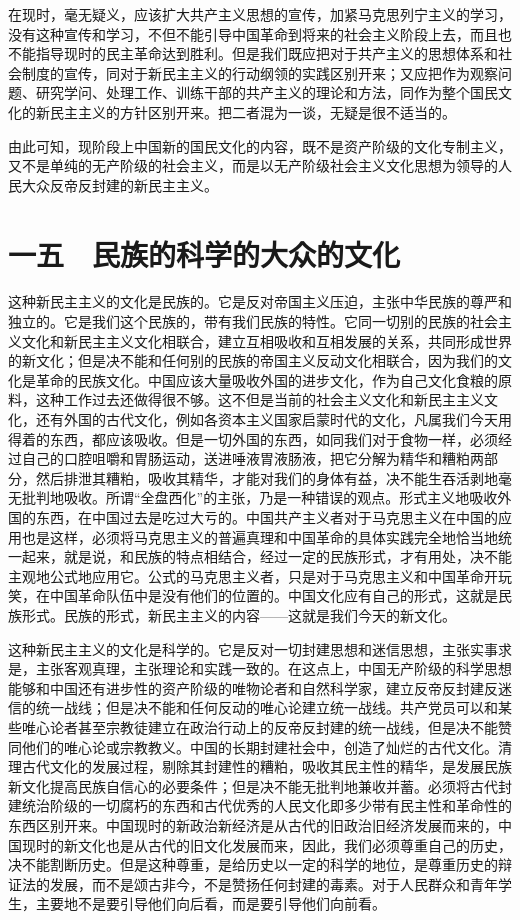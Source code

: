 在现时，毫无疑义，应该扩大共产主义思想的宣传，加紧马克思列宁主义的学习，没有这种宣传和学习，不但不能引导中国革命到将来的社会主义阶段上去，而且也不能指导现时的民主革命达到胜利。但是我们既应把对于共产主义的思想体系和社会制度的宣传，同对于新民主主义的行动纲领的实践区别开来；又应把作为观察问题、研究学问、处理工作、训练干部的共产主义的理论和方法，同作为整个国民文化的新民主主义的方针区别开来。把二者混为一谈，无疑是很不适当的。

由此可知，现阶段上中国新的国民文化的内容，既不是资产阶级的文化专制主义，又不是单纯的无产阶级的社会主义，而是以无产阶级社会主义文化思想为领导的人民大众反帝反封建的新民主主义。

\section{一五　民族的科学的大众的文化}

这种新民主主义的文化是民族的。它是反对帝国主义压迫，主张中华民族的尊严和独立的。它是我们这个民族的，带有我们民族的特性。它同一切别的民族的社会主义文化和新民主主义文化相联合，建立互相吸收和互相发展的关系，共同形成世界的新文化；但是决不能和任何别的民族的帝国主义反动文化相联合，因为我们的文化是革命的民族文化。中国应该大量吸收外国的进步文化，作为自己文化食粮的原料，这种工作过去还做得很不够。这不但是当前的社会主义文化和新民主主义文化，还有外国的古代文化，例如各资本主义国家启蒙时代的文化，凡属我们今天用得着的东西，都应该吸收。但是一切外国的东西，如同我们对于食物一样，必须经过自己的口腔咀嚼和胃肠运动，送进唾液胃液肠液，把它分解为精华和糟粕两部分，然后排泄其糟粕，吸收其精华，才能对我们的身体有益，决不能生吞活剥地毫无批判地吸收。所谓“全盘西化”的主张，乃是一种错误的观点。形式主义地吸收外国的东西，在中国过去是吃过大亏的。中国共产主义者对于马克思主义在中国的应用也是这样，必须将马克思主义的普遍真理和中国革命的具体实践完全地恰当地统一起来，就是说，和民族的特点相结合，经过一定的民族形式，才有用处，决不能主观地公式地应用它。公式的马克思主义者，只是对于马克思主义和中国革命开玩笑，在中国革命队伍中是没有他们的位置的。中国文化应有自己的形式，这就是民族形式。民族的形式，新民主主义的内容——这就是我们今天的新文化。

这种新民主主义的文化是科学的。它是反对一切封建思想和迷信思想，主张实事求是，主张客观真理，主张理论和实践一致的。在这点上，中国无产阶级的科学思想能够和中国还有进步性的资产阶级的唯物论者和自然科学家，建立反帝反封建反迷信的统一战线；但是决不能和任何反动的唯心论建立统一战线。共产党员可以和某些唯心论者甚至宗教徒建立在政治行动上的反帝反封建的统一战线，但是决不能赞同他们的唯心论或宗教教义。中国的长期封建社会中，创造了灿烂的古代文化。清理古代文化的发展过程，剔除其封建性的糟粕，吸收其民主性的精华，是发展民族新文化提高民族自信心的必要条件；但是决不能无批判地兼收并蓄。必须将古代封建统治阶级的一切腐朽的东西和古代优秀的人民文化即多少带有民主性和革命性的东西区别开来。中国现时的新政治新经济是从古代的旧政治旧经济发展而来的，中国现时的新文化也是从古代的旧文化发展而来，因此，我们必须尊重自己的历史，决不能割断历史。但是这种尊重，是给历史以一定的科学的地位，是尊重历史的辩证法的发展，而不是颂古非今，不是赞扬任何封建的毒素。对于人民群众和青年学生，主要地不是要引导他们向后看，而是要引导他们向前看。

